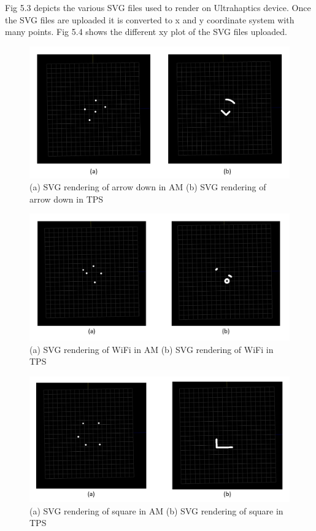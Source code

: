 Fig 5.3 depicts the various SVG files used to render on Ultrahaptics device. Once the SVG files are uploaded  it is converted to x and y coordinate system with many points. Fig 5.4 shows the different xy plot of the SVG files uploaded.
 

\begin{figure}[htb]
	\includegraphics[width=\textwidth]{gfx/svg_ad.png}
	\caption{(a) SVG rendering of arrow down in AM (b) SVG rendering of arrow down in TPS}
	\label{fig:validation:svg_ad}
\end{figure}

\begin{figure}[htb]
	\includegraphics[width=\textwidth]{gfx/svg_wifi.png}
	\caption{(a) SVG rendering of WiFi in AM (b) SVG rendering of WiFi in TPS}
	\label{fig:validation:svg_wifi}
\end{figure}

\begin{figure}[htb]
	\includegraphics[width=\textwidth]{gfx/svg_sq.png}
	\caption{(a) SVG rendering of square in AM (b) SVG rendering of square in TPS}
	\label{fig:validation:svg_sq}
\end{figure}

